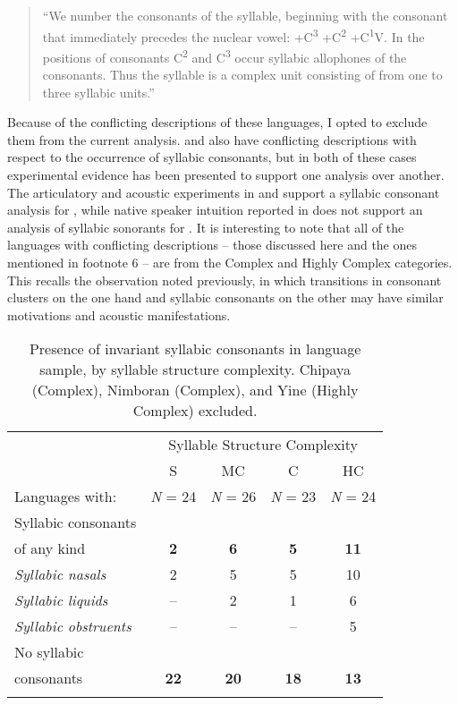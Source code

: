 \begin{quote}
“We number the consonants of the syllable, beginning with the consonant that immediately precedes the nuclear vowel: +C\textsuperscript{3} +C\textsuperscript{2} +C\textsuperscript{1}V. In the positions of consonants C\textsuperscript{2} and C\textsuperscript{3} occur syllabic allophones of the consonants. Thus the syllable is a complex unit consisting of from one to three syllabic units.” 
\citep[23]{Matteson1965}
\end{quote}

Because of the conflicting descriptions of these languages, I opted to exclude them from the current analysis.  and  also have conflicting descriptions with respect to the occurrence of syllabic consonants, but in both of these cases experimental evidence has been presented to support one analysis over another. The articulatory and acoustic experiments in \citet{Ridouane2008} and \citet{GoldsteinEtAl2007} support a syllabic consonant analysis for , while native speaker intuition reported in \citet{Chitoran1999} does not support an analysis of syllabic sonorants for . It is interesting to note that all of the languages with conflicting descriptions -- those discussed here and the ones mentioned in footnote 6 -- are from the Complex and Highly Complex categories. This recalls the observation noted previously, in which transitions in consonant clusters on the one hand and syllabic consonants on the other may have similar motivations and acoustic manifestations.

\begin{table}
\begin{tabular}{lcccc}
\lsptoprule
 & \multicolumn{4}{c}{Syllable Structure Complexity}\\\cmidrule(lr){2-5}
                        & S & MC & C & HC\\
  Languages with:       &  \textit{N} = 24   & \textit{N} = 26                & \textit{N} = 23     & \textit{N} = 24\\\midrule

 Syllabic consonants\\
   of any kind                         & \textbf{2} & \textbf{6} & \textbf{5} & \textbf{11}\\
 \textit{Syllabic nasals} & 2 & 5 & 5 & 10\\
 \textit{Syllabic liquids} & -- & 2 & 1 & 6\\
 \textit{Syllabic obstruents} & -- & -- & -- & 5\\
 No syllabic\\
    consonants            & \textbf{22} & \textbf{20} & \textbf{18} & \textbf{13}\\
\lspbottomrule
\end{tabular}
\caption{\label{tab:3.6}Presence of invariant syllabic consonants in language sample, by syllable structure complexity. Chipaya (Complex), Nimboran (Complex), and Yine (Highly Complex) excluded.}
\end{table}

